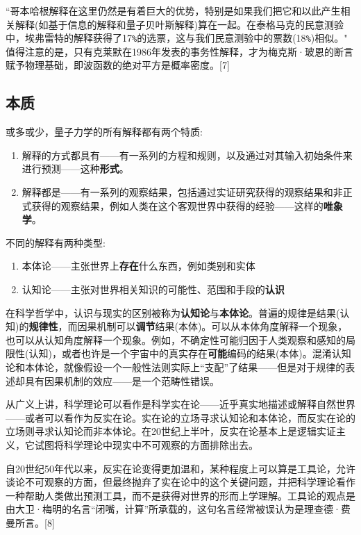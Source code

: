 “哥本哈根解释在这里仍然是有着巨大的优势，特别是如果我们把它和以此产生相关解释(如基于信息的解释和量子贝叶斯解释)算在一起。在泰格马克的民意测验中，埃弗雷特的解释获得了17\verb|%|的选票，这与我们民意测验中的票数(18\verb|%|)相似。"
值得注意的是，只有克莱默在1986年发表的事务性解释，才为梅克斯·玻恩的断言赋予物理基础，即波函数的绝对平方是概率密度。[7]

\subsection{本质}

或多或少，量子力学的所有解释都有两个特质:

\begin{enumerate}
\item  解释的方式都具有——有一系列的方程和规则，以及通过对其输入初始条件来进行预测——这种\textbf{形式}。
\item 解释都是——有一系列的观察结果，包括通过实证研究获得的观察结果和非正式获得的观察结果，例如人类在这个客观世界中获得的经验——这样的\textbf{唯象学}。
\end{enumerate}

不同的解释有两种类型:

\begin{enumerate}
\item 本体论——主张世界上\textbf{存在}什么东西，例如类别和实体
\item 认知论——主张对世界相关知识的可能性、范围和手段的\textbf{认识}
\end{enumerate}

在科学哲学中，认识与现实的区别被称为\textbf{认知论}与\textbf{本体论}。普遍的规律是结果(认知)的\textbf{规律性}，而因果机制可以\textbf{调节}结果(本体)。可以从本体角度解释一个现象，也可以从认知角度解释一个现象。例如，不确定性可能归因于人类观察和感知的局限性(认知)，或者也许是一个宇宙中的真实存在\textbf{可能}编码的结果(本体)。混淆认知论和本体论，就像假设一个一般性法则实际上“支配”了结果——但是对于规律的表述却具有因果机制的效应——是一个范畴性错误。

从广义上讲，科学理论可以看作是科学实在论——近乎真实地描述或解释自然世界——或者可以看作为反实在论。实在论的立场寻求认知论和本体论，而反实在论的立场则寻求认知论而非本体论。在20世纪上半叶，反实在论基本上是逻辑实证主义，它试图将科学理论中现实中不可观察的方面排除出去。

自20世纪50年代以来，反实在论变得更加温和，某种程度上可以算是工具论，允许谈论不可观察的方面，但最终抛弃了实在论中的这个关键问题，并把科学理论看作一种帮助人类做出预测工具，而不是获得对世界的形而上学理解。工具论的观点是由大卫·梅明的名言“闭嘴，计算”所承载的，这句名言经常被误认为是理查德·费曼所言。[8]

